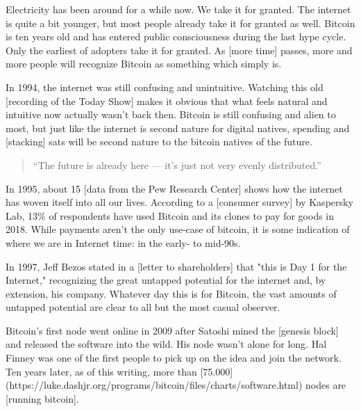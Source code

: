 Electricity has been around for a while now. We take it for granted. The
internet is quite a bit younger, but most people already take it for
granted as well. Bitcoin is ten years old and has entered public
consciousness during the last hype cycle. Only the earliest of adopters
take it for granted. As [more time] passes, more and more people will
recognize Bitcoin as something which simply is.

In 1994, the internet was still confusing and unintuitive. Watching this
old [recording of the Today Show] makes it obvious that what feels
natural and intuitive now actually wasn't back then. Bitcoin is still
confusing and alien to most, but just like the internet is second nature
for digital natives, spending and [stacking] sats will be second nature
to the bitcoin natives of the future.

\begin{quotation}
``The future is already here --- it's just not very evenly
distributed.''
\end{quotation}

In 1995, about 15%
[data from the Pew Research Center] shows how the internet has woven
itself into all our lives. According to a [consumer survey] by Kaspersky
Lab, 13\% of respondents have used Bitcoin and its clones to pay for
goods in 2018. While payments aren't the only use-case of bitcoin, it is
some indication of where we are in Internet time: in the early- to
mid-90s.

In 1997, Jeff Bezos stated in a [letter to shareholders] that "this is
Day 1 for the Internet," recognizing the great untapped potential for
the internet and, by extension, his company. Whatever day this is for
Bitcoin, the vast amounts of untapped potential are clear to all but the
most casual observer.


Bitcoin's first node went online in 2009 after Satoshi mined the
[genesis block] and released the software into the wild. His node wasn't
alone for long. Hal Finney was one of the first people to pick up on the
idea and join the network. Ten years later, as of this writing, more
than
[75.000](https://luke.dashjr.org/programs/bitcoin/files/charts/software.html)
nodes are [running bitcoin].

